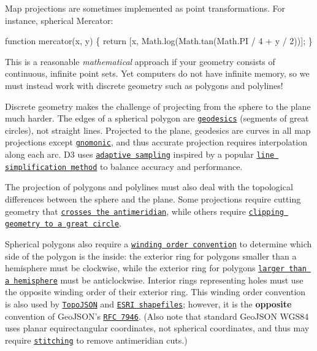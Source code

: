 Map projections are sometimes implemented as point transformations. For instance, spherical Mercator\+:


\begin{DoxyCode}
function mercator(x, y) \{
  return [x, Math.log(Math.tan(Math.PI / 4 + y / 2))];
\}
\end{DoxyCode}


This is a reasonable {\itshape mathematical} approach if your geometry consists of continuous, infinite point sets. Yet computers do not have infinite memory, so we must instead work with discrete geometry such as polygons and polylines!

Discrete geometry makes the challenge of projecting from the sphere to the plane much harder. The edges of a spherical polygon are \href{https://en.wikipedia.org/wiki/Geodesic}{\tt geodesics} (segments of great circles), not straight lines. Projected to the plane, geodesics are curves in all map projections except \href{#geoGnomonic}{\tt gnomonic}, and thus accurate projection requires interpolation along each arc. D3 uses \href{https://bl.ocks.org/mbostock/3795544}{\tt adaptive sampling} inspired by a popular \href{https://bost.ocks.org/mike/simplify/}{\tt line simplification method} to balance accuracy and performance.

The projection of polygons and polylines must also deal with the topological differences between the sphere and the plane. Some projections require cutting geometry that \href{https://bl.ocks.org/mbostock/3788999}{\tt crosses the antimeridian}, while others require \href{https://bl.ocks.org/mbostock/3021474}{\tt clipping geometry to a great circle}.

Spherical polygons also require a \href{https://bl.ocks.org/mbostock/a7bdfeb041e850799a8d3dce4d8c50c8}{\tt winding order convention} to determine which side of the polygon is the inside\+: the exterior ring for polygons smaller than a hemisphere must be clockwise, while the exterior ring for polygons \href{https://bl.ocks.org/mbostock/6713736}{\tt larger than a hemisphere} must be anticlockwise. Interior rings representing holes must use the opposite winding order of their exterior ring. This winding order convention is also used by \href{https://github.com/topojson}{\tt Topo\+J\+S\+ON} and \href{https://github.com/mbostock/shapefile}{\tt E\+S\+RI shapefiles}; however, it is the {\bfseries opposite} convention of Geo\+J\+S\+O\+N’s \href{https://tools.ietf.org/html/rfc7946#section-3.1.6}{\tt R\+FC 7946}. (Also note that standard Geo\+J\+S\+ON W\+G\+S84 uses planar equirectangular coordinates, not spherical coordinates, and thus may require \href{https://github.com/d3/d3-geo-projection/blob/master/README.md#geostitch}{\tt stitching} to remove antimeridian cuts.)

